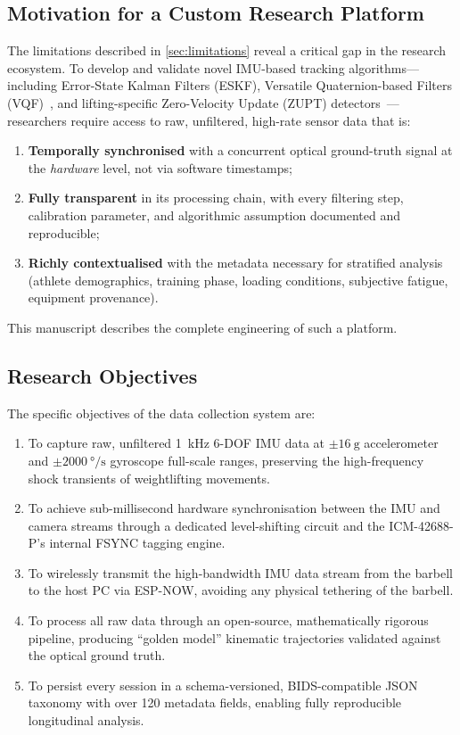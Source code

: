 \subsection{Motivation for a Custom Research Platform}\label{sec:motivation}

The limitations described in \cref{sec:limitations} reveal a critical gap in the research ecosystem.
To develop and validate novel IMU-based tracking algorithms---including Error-State Kalman Filters (ESKF), Versatile Quaternion-based Filters (VQF)~\cite{laidig2023}, and lifting-specific Zero-Velocity Update (ZUPT) detectors~\cite{skog2010}---researchers require access to raw, unfiltered, high-rate sensor data that is:
\begin{enumerate}[nosep]
  \item \textbf{Temporally synchronised} with a concurrent optical ground-truth signal at the \emph{hardware} level, not via software timestamps;
  \item \textbf{Fully transparent} in its processing chain, with every filtering step, calibration parameter, and algorithmic assumption documented and reproducible;
  \item \textbf{Richly contextualised} with the metadata necessary for stratified analysis (athlete demographics, training phase, loading conditions, subjective fatigue, equipment provenance).
\end{enumerate}

This manuscript describes the complete engineering of such a platform.


\subsection{Research Objectives}

The specific objectives of the data collection system are:
\begin{enumerate}[nosep]
  \item To capture raw, unfiltered \SI{1}{\kilo\hertz} 6-DOF IMU data at $\pm\SI{16}{\g}$ accelerometer and $\pm\SI{2000}{\degree\per\second}$ gyroscope full-scale ranges, preserving the high-frequency shock transients of weightlifting movements.
  \item To achieve sub-millisecond hardware synchronisation between the IMU and camera streams through a dedicated level-shifting circuit and the ICM-42688-P's internal FSYNC tagging engine.
  \item To wirelessly transmit the high-bandwidth IMU data stream from the barbell to the host PC via ESP-NOW, avoiding any physical tethering of the barbell.
  \item To process all raw data through an open-source, mathematically rigorous pipeline, producing ``golden model'' kinematic trajectories validated against the optical ground truth.
  \item To persist every session in a schema-versioned, BIDS-compatible JSON taxonomy with over 120 metadata fields, enabling fully reproducible longitudinal analysis.
\end{enumerate}


